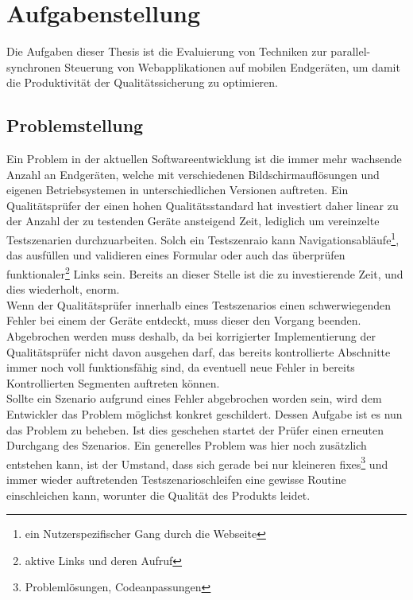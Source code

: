 \chapter{Aufgabenstellung}
Die Aufgaben dieser Thesis ist die Evaluierung von Techniken zur parallel-synchronen Steuerung von Webapplikationen auf mobilen Endgeräten, um damit die Produktivität der Qualitätssicherung zu optimieren.
	\section{Problemstellung}
	Ein Problem in der aktuellen Softwareentwicklung ist die immer mehr wachsende Anzahl an Endgeräten, welche mit 			verschiedenen Bildschirmauflösungen und eigenen Betriebsystemen in unterschiedlichen Versionen auftreten. Ein 				Qualitätsprüfer der einen hohen Qualitätsstandard hat investiert daher linear zu der Anzahl der zu testenden Geräte ansteigend 	Zeit, lediglich um vereinzelte Testszenarien durchzuarbeiten. Solch ein Testszenraio kann Navigationsabläufe\footnote{ein 		Nutzerspezifischer Gang durch die Webseite}, das ausfüllen und validieren eines Formular oder auch das überprüfen 			funktionaler\footnote{aktive Links und deren Aufruf} Links sein. Bereits an dieser Stelle ist die zu investierende Zeit, und dies 		wiederholt, enorm.
	\\
	Wenn der Qualitätsprüfer innerhalb eines Testszenarios einen schwerwiegenden Fehler bei einem der Geräte entdeckt, muss 		dieser den Vorgang beenden. Abgebrochen werden muss deshalb, da bei korrigierter Implementierung der Qualitätsprüfer nicht 	davon ausgehen darf, das bereits kontrollierte Abschnitte immer noch voll funktionsfähig sind, da eventuell neue Fehler in bereits 	Kontrollierten Segmenten auftreten können.
	\\
	Sollte ein Szenario aufgrund eines Fehler abgebrochen worden sein, wird dem Entwickler das Problem möglichst konkret 		geschildert. Dessen Aufgabe ist es nun das Problem zu beheben. Ist dies geschehen startet der Prüfer einen erneuten 			Durchgang des Szenarios. Ein generelles Problem was hier noch zusätzlich entstehen kann, ist der Umstand, dass sich gerade 		bei nur kleineren fixes\footnote{Problemlösungen, Codeanpassungen} und immer wieder auftretenden Testszenarioschleifen 		eine gewisse Routine einschleichen kann, worunter die Qualität des Produkts leidet.

